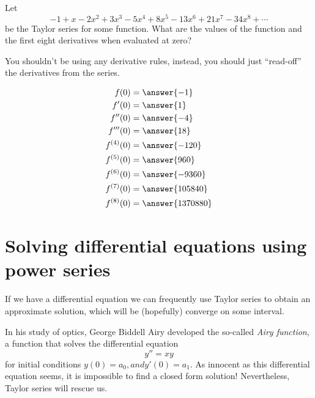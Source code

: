 \documentclass{ximera}
\begin{document}
\begin{question}
  Let
  \[
  -1 + x - 2x^2 + 3x^3 - 5x^4 + 8x^5-13x^6+21x^7 -34x^8 + \cdots  
  \]
  be the Taylor series for some function. What are the values of the
  function and the first eight derivatives when evaluated at zero?
  \begin{hint}
    You shouldn't be using any derivative rules, instead, you should
    just ``read-off'' the derivatives from the series.
  \end{hint}
  \begin{prompt}
    \begin{align*}
      f(0) &= \answer{-1}\\
      f'(0) &= \answer{1}\\
      f''(0) &= \answer{-4}\\
      f'''(0) &= \answer{18}\\
      f^{(4)}(0) &= \answer{-120}\\
      f^{(5)}(0) &= \answer{960}\\
      f^{(6)}(0) &= \answer{-9360}\\
      f^{(7)}(0) &= \answer{105840}\\
      f^{(8)}(0) &= \answer{1370880}
    \end{align*}
  \end{prompt}
\end{question}




\section{Solving differential equations using power series}

If we have a differential equation we can frequently use Taylor series
to obtain an approximate solution, which will be (hopefully) converge
on some interval.

In his study of optics, George Biddell Airy developed the so-called
\textit{Airy function}, a function that solves the differential
equation
\[
y'' = xy
\]
for initial conditions $y(0) = a_0, and y'(0) = a_1$.  As innocent as
this differential equation seems, it is impossible to find a closed
form solution! Nevertheless, Taylor series will rescue us.
\end{document}
